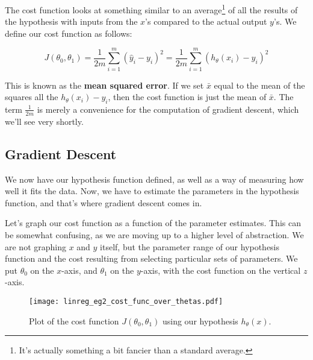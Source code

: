 The cost function looks at something similar to an average\footnote{It's actually something a bit fancier than a standard average.} of all the results of the hypothesis with inputs from the $x$'s compared to the actual output $y$'s. We define our cost function as follows:

\begin{equation}
J\left( \theta_0, \theta_1 \right) = \frac{1}{2m} \sum_{i=1}^m \left(\hat{y}_i - y_i \right)^2 = \frac{1}{2m} \sum_{i=1}^m \left(h_\theta\left( x_i \right) - y_i \right)^2
\end{equation}

This is known as the \textbf{mean squared error}. If we set $\bar{x}$ equal to the mean of the squares all the $ h_\theta \left( x_i \right) - y_i$, then the cost function is just the mean of $\bar{x}$. The term $\frac{1}{2m}$ is merely a convenience for the computation of gradient descent, which we'll see very shortly. 


\subsection{Gradient Descent}
\label{chaplinreg-sectunivar-subsect:graddsc}

We now have our hypothesis function defined, as well as a way of measuring how well it fits the data. Now, we have to estimate the parameters in the hypothesis function, and that's where gradient descent comes in. 

Let's graph our cost function as a function of the parameter estimates. This can be somewhat confusing, as we are moving up to a higher level of abstraction. We are not graphing $x$ and $y$ itself, but the parameter range of our hypothesis function and the cost resulting from selecting particular sets of parameters. We put $\theta_0$ on the $x$-axis, and $\theta_1$ on the $y$-axis, with the cost function on the vertical $z$-axis.

\begin{figure}[h] %
   \centering
    \graphicspath{{./Figures/}} %
   \texttt{[image: linreg\_eg2\_cost\_func\_over\_thetas.pdf]} 
   \caption[]{Plot of the cost function $J\left(\theta_0, \theta_1 \right)$ using our hypothesis $h_\theta\left( x \right)$.}
   \label{s}
\end{figure}

